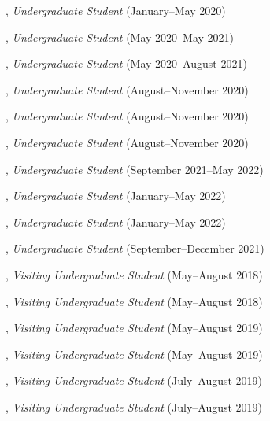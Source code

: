 \documentclass[10pt]{article}
\newenvironment{myindentpar}[1]%
{\begin{list}{}%
         {\setlength{\leftmargin}{#1}}%
         \item[]%
}
{\end{list}}
\newcounter{list}
\begin{document}
\begin{myindentpar}{0.75cm}
\hspace{-0.75cm}{\bf Luke Marushack}, \textit{Undergraduate Student} (January--May 2020)

\hspace{-0.75cm}{\bf Michael Lee}, \textit{Undergraduate Student} (May 2020--May 2021)

\hspace{-0.75cm}{\bf Ms. Ann Hermann}, \textit{Undergraduate Student} (May 2020--August 2021)

\hspace{-0.75cm}{\bf Joseph Kuebler}, \textit{Undergraduate Student} (August--November 2020)

\hspace{-0.75cm}{\bf Facundo Munoz}, \textit{Undergraduate Student} (August--November 2020)

\hspace{-0.75cm}{\bf Fangcong Yin}, \textit{Undergraduate Student} (August--November 2020)

\hspace{-0.75cm}{\bf Jackson Ballow}, \textit{Undergraduate Student} (September 2021--May 2022)

\hspace{-0.75cm}{\bf Ryan Pairitz}, \textit{Undergraduate Student} (January--May 2022)

\hspace{-0.75cm}{\bf Kekoa Wang}, \textit{Undergraduate Student} (January--May 2022)

\hspace{-0.75cm}{\bf Ms. Longqing Chen}, \textit{Undergraduate Student} (September--December 2021)

\hspace{-0.75cm}{\bf Wenhao Yu}, \textit{Visiting Undergraduate Student} (May--August 2018)

\hspace{-0.75cm}{\bf Ms. Yu Shu}, \textit{Visiting Undergraduate Student} (May--August 2018)

\hspace{-0.75cm}{\bf Chuchen Deng}, \textit{Visiting Undergraduate Student} (May--August 2019)

\hspace{-0.75cm}{\bf Yihong Ma}, \textit{Visiting Undergraduate Student} (May--August 2019)

\hspace{-0.75cm}{\bf Xin Liu}, \textit{Visiting Undergraduate Student} (July--August 2019)

\hspace{-0.75cm}{\bf Wei Peng}, \textit{Visiting Undergraduate Student} (July--August 2019)


\end{myindentpar}
\end{document}
